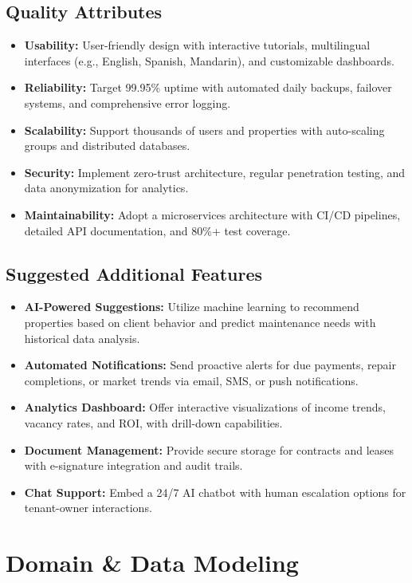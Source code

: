 \documentclass[12pt]{article}
\begin{document}
\subsection{Quality Attributes}
\begin{itemize}
    \item \textbf{Usability:} User-friendly design with interactive tutorials, multilingual interfaces (e.g., English, Spanish, Mandarin), and customizable dashboards.
    \item \textbf{Reliability:} Target 99.95\% uptime with automated daily backups, failover systems, and comprehensive error logging.
    \item \textbf{Scalability:} Support thousands of users and properties with auto-scaling groups and distributed databases.
    \item \textbf{Security:} Implement zero-trust architecture, regular penetration testing, and data anonymization for analytics.
    \item \textbf{Maintainability:} Adopt a microservices architecture with CI/CD pipelines, detailed API documentation, and 80\%+ test coverage.
\end{itemize}

\subsection{Suggested Additional Features}
\begin{itemize}
    \item \textbf{AI-Powered Suggestions:} Utilize machine learning to recommend properties based on client behavior and predict maintenance needs with historical data analysis.
    \item \textbf{Automated Notifications:} Send proactive alerts for due payments, repair completions, or market trends via email, SMS, or push notifications.
    \item \textbf{Analytics Dashboard:} Offer interactive visualizations of income trends, vacancy rates, and ROI, with drill-down capabilities.
    \item \textbf{Document Management:} Provide secure storage for contracts and leases with e-signature integration and audit trails.
    \item \textbf{Chat Support:} Embed a 24/7 AI chatbot with human escalation options for tenant-owner interactions.
\end{itemize}

\section{Domain \& Data Modeling}
\end{document}
